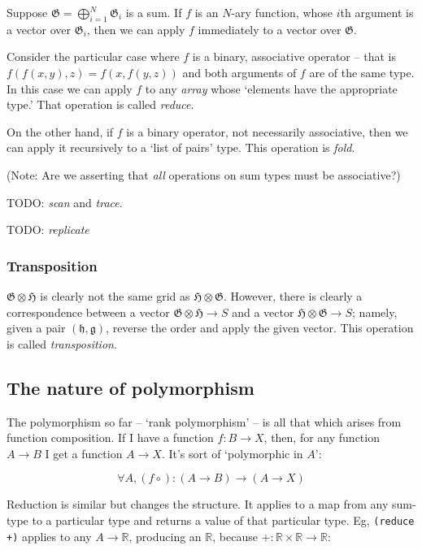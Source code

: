 \documentclass[11pt]{article}
\newcommand{\gr}[1]{\mathfrak{#1}}
\newcommand{\R}{\mathbb{R}}
\begin{document}
Suppose \(\gr{G} = \bigoplus_{i = 1}^N \gr{G}_i\) is a sum. If \(f\) is an \(N\)-ary
function, whose \(i\)th argument is a vector over \(\gr{G}_i\), then we can apply
\(f\) immediately to a vector over \(\gr{G}\).

Consider the particular case where \(f\) is a binary, associative operator -- that
is \(f(f(x, y), z) = f(x, f(y, z))\) and both arguments of \(f\) are of the same
type. In this case we can apply \(f\) to any \emph{array} whose ‘elements have the
appropriate type.’ That operation is called \emph{reduce}.

On the other hand, if \(f\) is a binary operator, not necessarily associative,
then we can apply it recursively to a ‘list of pairs’ type. This operation is
\emph{fold}.

(Note: Are we asserting that \emph{all} operations on sum types must be associative?)

TODO: \emph{scan} and \emph{trace}. 

TODO: \emph{replicate}

\subsubsection{Transposition}
\label{sec:org68e418b}

\(\gr{G}\otimes\gr{H}\) is clearly not the same grid as
\(\gr{H}\otimes\gr{G}\). However, there is clearly a correspondence between a
vector \(\gr{G}\otimes\gr{H}\to S\) and a vector \(\gr{H}\otimes\gr{G}\to
S\); namely, given a pair \((\gr{h}, \gr{g})\), reverse the order and apply the
given vector. This operation is called \emph{transposition}. 

\subsection{The nature of polymorphism}
\label{sec:orgd61f222}

The polymorphism so far -- ‘rank polymorphism’ -- is all that which arises from
function composition. If I have a function \(f:B\to X\), then, for any function
\(A\to B\) I get a function \(A\to X\). It's sort of ‘polymorphic in \(A\)’:

$$
\forall A, (f\circ) : (A\to B)\to (A\to X)
$$

Reduction is similar but changes the structure. It applies to a map from any
sum-type to a particular type and returns a value of that particular type. Eg,
\texttt{(reduce +)} applies to any \(A\to\R\), producing an \(\R\), because
\(+:\R\times\R\to\R\):
\end{document}
